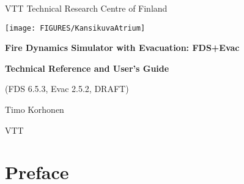 \documentclass[12pt,a4paper,final,twoside]{stylevk}
\begin{document}


\newcommand{\Timts}[1]{\textnormal{\texttt{\textsl{#1}}}}
\newcommand{\Timtt}[1]{{\tt{#1}}}
\newcommand{\QS}{\hbox{\textquotesingle}}

\fancyhead{}
\fancyfoot[C]{\today}
\renewcommand{\headrulewidth}{0.0pt}
\renewcommand{\footrulewidth}{0.0pt}

\begin{titlepage}

  \thispagestyle{fancy}

  \begin{center}

    VTT Technical Research Centre of Finland

    \vspace{20mm}
   \centerline{\texttt{[image: FIGURES/KansikuvaAtrium]}}  
    \vspace{10mm}

    { \normalfont\fontsize{28}{42}\selectfont\bfseries\sffamily
      Fire Dynamics Simulator with Evacuation: FDS+Evac
    }

    \vspace{6mm}

    { \normalfont\fontsize{22}{28}\selectfont\bfseries\sffamily
      Technical Reference and User's Guide }

    { \normalfont\fontsize{14}{18}\selectfont\sffamily
      (FDS 6.5.3, Evac 2.5.2, DRAFT) }

    \vspace{15mm}

    { \normalfont\fontsize{14}{18}\selectfont\sffamily
      Timo Korhonen }

    \vspace{3mm}

    { \normalfont\fontsize{12}{16}\selectfont\sffamily
      VTT}

  \end{center}


\vspace{2cm}
    

\end{titlepage}

\setcounter{page}{4}

\newpage


\chapter*{Preface}
\end{document}
